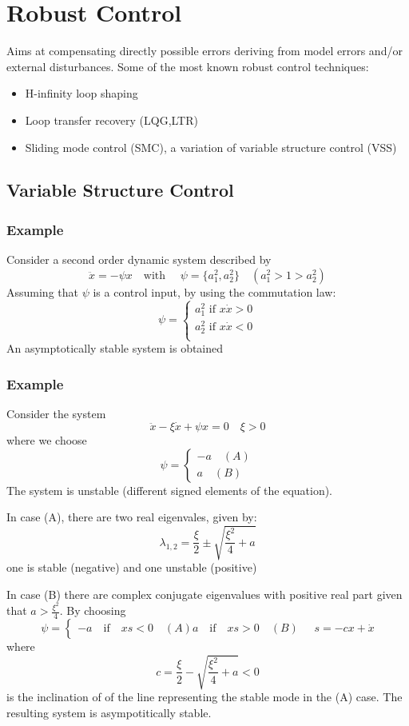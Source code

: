 \documentclass{book}
\begin{document}
\section{Robust Control}
Aims at compensating directly possible errors deriving from model errors and/or external disturbances. Some of the most known robust control techniques:
\begin{itemize}
    \item H-infinity loop shaping
    \item Loop transfer recovery (LQG,LTR)
    \item Sliding mode control (SMC), a variation of variable structure control (VSS)
\end{itemize}
\subsection{Variable Structure Control}
\subsubsection{Example}
Consider a second order dynamic system described by 
\[
    \ddot{x}=-\psi x \quad \text{with } \quad \psi= \{a_1^2,a_2^2\} \quad (a_1^2>1>a_2^2)
\]
Assuming that $\psi$ is a control input, by using the commutation law:
\[
    \psi=\begin{cases}
        a_1^2 \text{ if } x\dot{x}>0\\
        a_2^2 \text{ if } x\dot{x}<0\\
    \end{cases}
\]
An asymptotically stable system is obtained
\subsubsection{Example}
Consider the system
\[
    \ddot{x}-\xi \dot{x}+\psi x = 0 \quad \xi >0 
\]
where we choose
\[
    \psi = \begin{cases}
        -a \quad (A)\\
        a \quad (B)
    \end{cases}
\]
The system is unstable (different signed elements of the equation).

In case (A), there are two real eigenvales, given by:
\[
    \lambda_{1,2} = \displaystyle\frac{\xi}{2}\pm \sqrt{\displaystyle\frac{\xi^2}{4}+a}
\]
one is stable (negative) and one unstable (positive)

In case (B) there are complex conjugate eigenvalues with positive real part given that $a>\frac{\xi^2}{4}$. 
By choosing
\[
    \psi = \begin{cases}
        -a \quad \text{if} \quad xs<0 \quad (A)
        a \quad \text{if} \quad xs>0 \quad (B)
    \end{cases} \quad s = -cx +\dot{x}
\]
where
\[
    c=\frac{\xi}{2}-\sqrt{\frac{\xi^2}{4}+a}<0
\]
is the inclination of of the line representing the stable mode in the (A) case. The resulting system is asympotitically stable.
\end{document}
